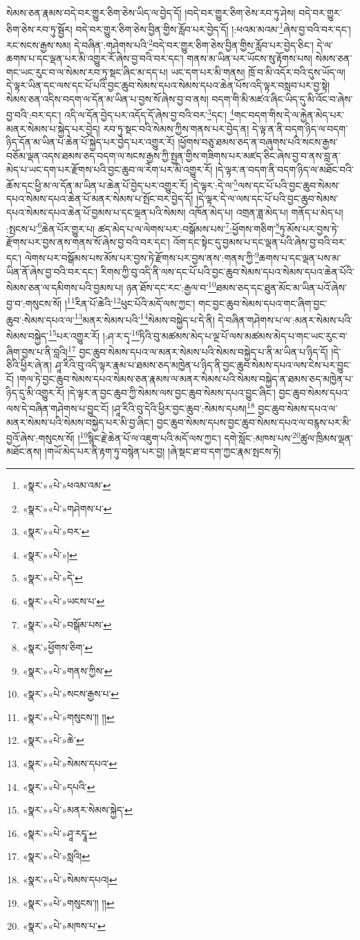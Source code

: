 སེམས་ཅན་རྣམས་བདེ་བར་གྱུར་ཅིག་ཅེས་ཡིད་ལ་བྱེད་དོ། །བདེ་བར་གྱུར་ཅིག་ཅེས་རབ་ཏུ་ཤེས། བདེ་བར་གྱུར་ཅིག་ཅེས་རབ་ཏུ་སྦྱོར། བདེ་བར་གྱུར་ཅིག་ཅེས་བྱིན་གྱིས་རློབ་པར་བྱེད་དོ། །:ཕའམ་མའམ་\footnote{«སྣར་»«པེ་»ཕའམ་འམ་}ཞེས་བྱ་བའི་བར་དང་། རང་སངས་རྒྱས་སམ། དེ་བཞིན་:གཤེགས་པའི་\footnote{«སྣར་»«པེ་»གཤེགས་པ་}བདེ་བར་གྱུར་ཅིག་ཅེས་བྱིན་གྱིས་རློབ་པར་བྱེད་ཅིང་། དེ་ལ་ཆགས་པ་དང་ལྡན་པར་མི་འགྱུར་རོ་ཞེས་བྱ་བའི་བར་དང་། གནས་མ་ཡིན་པར་ཡོངས་སུ་རྟོགས་པས། སེམས་ཅན་གང་ཡང་རུང་བ་ལ་སེམས་རབ་ཏུ་སྡང་ཞིང་མ་དད་པ། ཡང་དག་པར་མི་གནས། ཁྲོ་བ་མི་འདོར་བའི་དུས་ཡོད་ལ། དེ་ལྟར་ཡིན་དང་ལས་དང་པོ་པའི་བྱང་ཆུབ་སེམས་དཔའ་སེམས་དཔའ་ཆེན་པོས་འདི་ལྟར་བསླབ་པར་བྱ་སྟེ། སེམས་ཅན་འདིས་བདག་ལ་དོན་མ་ཡིན་པ་བྱས་སོ་ཞེས་བྱ་བ་ནས། བདག་གི་མི་མཛའ་ཞིང་ཡིད་དུ་མི་འོང་བ་ཞེས་བྱ་བའི་:བར་དང་། འདི་ལ་དོན་བྱེད་པར་འདོད་དོ་ཞེས་བྱ་བའི་བར་\footnote{«སྣར་»«པེ་»བར་}དང་། \footnote{«སྣར་»«པེ་»།  }གང་བདག་གིས་དེ་ལ་རྐྱེན་མེད་པར་མནར་སེམས་པ་སྐྱེད་པར་བྱེད། རབ་ཏུ་སྡང་བའི་སེམས་ཀྱིས་གནས་པར་བྱེད་ན། དེ་ལྟ་ན་ནི་བདག་ཉིད་ལ་བདག་ཉིད་དོན་མ་ཡིན་པ་ཆེན་པོ་སྐྱེད་པར་བྱེད་པར་འགྱུར་རོ། །ཕྱོགས་བཅུ་ཐམས་ཅད་ན་བཞུགས་པའི་སངས་རྒྱས་བཅོམ་ལྡན་འདས་ཐམས་ཅད་བདག་ལ་སངས་རྒྱས་ཀྱི་སྤྱན་གྱིས་གཟིགས་པར་མཛད་ཅིང་ཞེས་བྱ་བ་ནས་བླ་ན་མེད་པ་ཡང་དག་པར་རྫོགས་པའི་བྱང་ཆུབ་ལ་རེག་པར་མི་འགྱུར་རོ། །དེ་ལྟར་ན་བདག་ནི་བདག་ཉིད་ལ་མཐོང་བའི་ཆོས་དང་ཕྱི་མ་ལ་དོན་མ་ཡིན་པ་ཆེན་པོ་བྱེད་པར་འགྱུར་རོ། །དེ་ལྟར་:དེ་ལ་\footnote{«སྣར་»«པེ་»དེ་}ལས་དང་པོ་པའི་བྱང་ཆུབ་སེམས་དཔའ་སེམས་དཔའ་ཆེན་པོ་མནར་སེམས་པ་སྤོང་བར་བྱེད་དོ། །དེ་ལྟར་དེ་ལ་ལས་དང་པོ་པའི་བྱང་ཆུབ་སེམས་དཔའ་སེམས་དཔའ་ཆེན་པོ་བྱམས་པ་དང་ལྡན་པའི་སེམས། འཁོན་མེད་པ། འགྲན་ཟླ་མེད་པ། གནོད་པ་མེད་པ། :སྤངས་པ་\footnote{«སྣར་»«པེ་»ཡངས་པ་}ཆེན་པོར་གྱུར་པ། ཚད་མེད་པ་ལ་ལེགས་པར་:བསྒོམས་པས་\footnote{«སྣར་»«པེ་»བསྒོམ་པས་}:ཕྱོགས་གཅིག་\footnote{«སྣར་»ཕྱོགས་ཅིག་}ཏུ་མོས་པར་བྱས་ཏེ་རྫོགས་པར་བྱས་ནས་གནས་སོ་ཞེས་བྱ་བའི་བར་དང་། འོག་དང་སྟེང་དུ་བྱམས་པ་དང་ལྡན་པའི་ཞེས་བྱ་བའི་བར་དང་། ལེགས་པར་བསྒོམས་པས་མོས་པར་བྱས་ཏེ་རྫོགས་པར་བྱས་ནས་:གནས་ཀྱི་\footnote{«སྣར་»«པེ་»གནས་ཀྱིས་}ཆགས་པ་དང་ལྡན་པས་མ་ཡིན་ནོ་ཞེས་བྱ་བའི་བར་དང་། རིགས་ཀྱི་བུ་འདི་ནི་ལས་དང་པོ་པའི་བྱང་ཆུབ་སེམས་དཔའ་སེམས་དཔའ་ཆེན་པོའི་སེམས་ཅན་ལ་དམིགས་པའི་བྱམས་པ། ཉན་ཐོས་དང་རང་:རྒྱལ་བ་\footnote{«སྣར་»«པེ་»སངས་རྒྱས་པ་}ཐམས་ཅད་དང་ཐུན་མོང་མ་ཡིན་པའོ་ཞེས་བྱ་བ་:གསུངས་སོ། །\footnote{«སྣར་»«པེ་»གསུངས་།། །།}རིན་པོ་ཆེའི་\footnote{«སྣར་»«པེ་»ཆེ་}ཕུང་པོའི་མདོ་ལས་ཀྱང་། གང་བྱང་ཆུབ་སེམས་དཔའ་གང་ཞིག་བྱང་ཆུབ་:སེམས་དཔའ་ལ་\footnote{«སྣར་»«པེ་»སེམས་དཔའ་}མནར་སེམས་པའི་\footnote{«སྣར་»«པེ་»དཔའི་}སེམས་བསྐྱེད་པ་དེ་ནི། དེ་བཞིན་གཤེགས་པ་ལ་:མནར་སེམས་པའི་སེམས་བསྐྱེད་\footnote{«སྣར་»«པེ་»མནར་སེམས་སྐྱེད་}པར་འགྱུར་རོ། །:ཤ་ར་དྭ་\footnote{«སྣར་»«པེ་»ཤཱ་རདྭཱ་}ཏིའི་བུ་མཚམས་མེད་པ་ལྔ་པོ་ལས་མཚམས་མེད་པ་གང་ཡང་རུང་བ་ཞིག་བྱས་པ་ནི་བླའི།\footnote{«སྣར་»«པེ་»སླའི།} བྱང་ཆུབ་སེམས་དཔའ་ལ་མནར་སེམས་པའི་སེམས་བསྐྱེད་པ་ནི་མ་ཡིན་པ་ཉིད་དོ། །དེ་ཅིའི་ཕྱིར་ཞེ་ན། ཤཱ་རིའི་བུ་འདི་ལྟར་རྣམ་པ་ཐམས་ཅད་མཁྱེན་པ་ཉིད་ནི་བྱང་ཆུབ་སེམས་དཔའ་ལས་ངེས་པར་བྱུང་ངོ། །གལ་ཏེ་བྱང་ཆུབ་སེམས་དཔའ་སེམས་ཅན་རྣམས་ལ་མནར་སེམས་པའི་སེམས་བསྐྱེད་ན་ཐམས་ཅད་མཁྱེན་པ་ཉིད་དུ་མི་འགྱུར་རོ། །དེ་ལྟར་ན་བྱང་ཆུབ་ཀྱི་སེམས་ལས་བྱང་ཆུབ་སེམས་དཔའ་བྱུང་ཞིང་། བྱང་ཆུབ་སེམས་དཔའ་ལས་དེ་བཞིན་གཤེགས་པ་བྱུང་ངོ། །ཤཱ་རིའི་བུ་དེའི་ཕྱིར་བྱང་ཆུབ་:སེམས་དཔས།\footnote{«སྣར་»«པེ་»སེམས་དཔའ།} བྱང་ཆུབ་སེམས་དཔའ་ལ་མནར་སེམས་པའི་སེམས་བསྐྱེད་པར་མི་བྱ་ཞིང་། བྱང་ཆུབ་སེམས་དཔས་བྱང་ཆུབ་སེམས་དཔའ་ལ་བརྙས་པར་མི་བྱའོ་ཞེས་:གསུངས་སོ། །\footnote{«སྣར་»«པེ་»གསུངས་།། །།}སྙིང་རྗེ་ཆེན་པོ་ལ་འཇུག་པའི་མདོ་ལས་ཀྱང་། དགེ་སློང་:མཁས་པས་\footnote{«སྣར་»«པེ་»མཁས་པ་}ཚུལ་ཁྲིམས་ལྡན་མཐོང་ནས། །གཡོ་མེད་པར་ནི་རྟག་ཏུ་བསྙེན་པར་བྱ། །ཞེ་སྡང་ཐ་བ་དག་ཀྱང་རྣམ་སྤངས་ཏེ། 